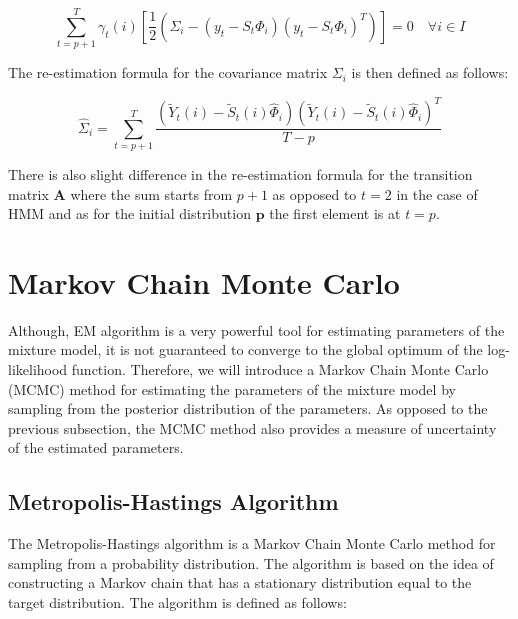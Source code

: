 \begin{equation} \label{eq:pd_sigma}
    \sum_{t=p+1}^{T} \gamma_t(i) \left[\frac{1}{2} \left(\Sigma_i - (y_t - S_t \Phi_{i})(y_t - S_t \Phi_{i})^T\right) \right] = 0 \quad \forall i \in I
\end{equation}

The re-estimation formula for the covariance matrix $\Sigma_i$ is then defined as follows:

\begin{equation}
    \hat{\Sigma}_i = \sum_{t=p+1}^{T} \frac{\left(\tilde{Y}_t(i) - \tilde{S}_t(i) \hat{\Phi}_i \right) \left(\tilde{Y}_t(i) - \tilde{S}_t(i) \hat{\Phi}_i \right)^T}{T - p}
\end{equation}

There is also slight difference in the re-estimation formula for the transition matrix $\textbf{A}$ where the sum starts from $p+1$ as opposed to $t=2$ in the case of HMM and 
as for the initial distribution $\textbf{p}$ the first element is at $t=p$. \citep{Xuan2004}

\section{Markov Chain Monte Carlo}

Although, EM algorithm is a very powerful tool for estimating parameters of the mixture model,
it is not guaranteed to converge to the global optimum of the log-likelihood function. Therefore, 
we will introduce a Markov Chain Monte Carlo (MCMC) method for estimating the parameters of the mixture model by 
sampling from the posterior distribution of the parameters. \citep{Speagle2020} As opposed to the previous subsection, the MCMC method 
also provides a measure of uncertainty of the estimated parameters. \citep{Spade2020}     

\subsection{Metropolis-Hastings Algorithm}

The Metropolis-Hastings algorithm is a Markov Chain Monte Carlo method for sampling from a probability distribution. 
The algorithm is based on the idea of constructing a Markov chain that has a stationary distribution equal to the target distribution.
The algorithm is defined as follows:

